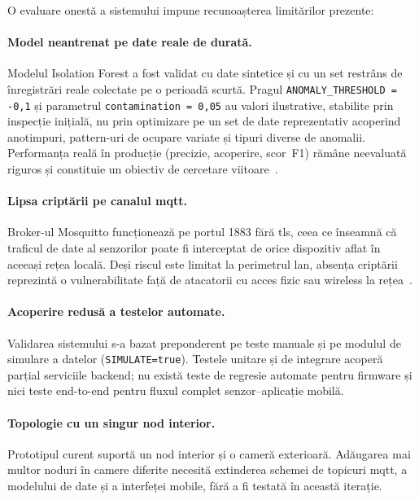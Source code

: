 O evaluare onestă a sistemului impune recunoașterea limitărilor prezente:

\paragraph{Model neantrenat pe date reale de durată.}  Modelul Isolation
Forest a fost validat cu date sintetice și cu un set restrâns de înregistrări
reale colectate pe o perioadă scurtă.  Pragul \texttt{ANOMALY\_THRESHOLD =
-0{,}1} și parametrul \texttt{contamination = 0{,}05} au valori
ilustrative, stabilite prin inspecție inițială, nu prin optimizare pe un set
de date reprezentativ acoperind anotimpuri, pattern-uri de ocupare variate și
tipuri diverse de anomalii.  Performanța reală în producție (precizie,
acoperire, scor~F1) rămâne neevaluată riguros și constituie un obiectiv de
cercetare viitoare~\cite{davis2006prcurve,fawcett2006roc}.

\paragraph{Lipsa criptării pe canalul \gls{mqtt}.}  Broker-ul Mosquitto
funcționează pe portul 1883 fără \gls{tls}, ceea ce înseamnă că traficul de
date al senzorilor poate fi interceptat de orice dispozitiv aflat în aceeași
rețea locală.  Deși riscul este limitat la perimetrul \gls{lan}, absența
criptării reprezintă o vulnerabilitate față de atacatorii cu acces fizic sau
wireless la rețea~\cite{alrawi2019sokhome}.

\paragraph{Acoperire redusă a testelor automate.}  Validarea sistemului s-a
bazat preponderent pe teste manuale și pe modulul de simulare a datelor
(\texttt{SIMULATE=true}).  Testele unitare și de integrare acoperă parțial
serviciile backend; nu există teste de regresie automate pentru firmware și
nici teste end-to-end pentru fluxul complet senzor–aplicație mobilă.

\paragraph{Topologie cu un singur nod interior.}  Prototipul curent suportă
un nod interior și o cameră exterioară.  Adăugarea mai multor noduri în
camere diferite necesită extinderea schemei de topicuri \gls{mqtt}, a
modelului de date și a interfeței mobile, fără a fi testată în această
iterație.

